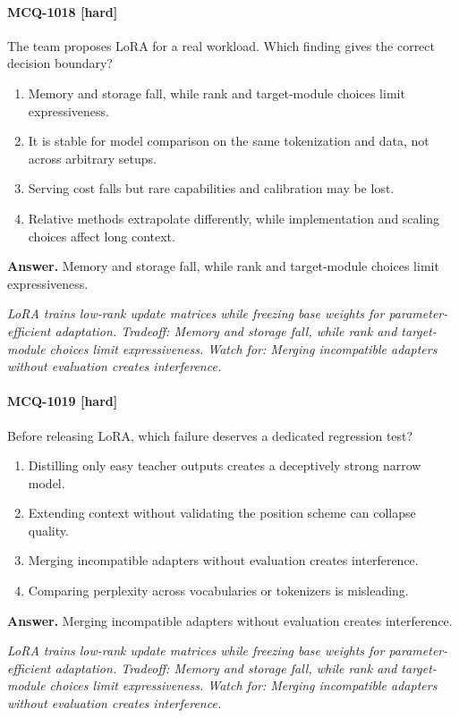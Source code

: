 \paragraph{MCQ-1018 [hard]} The team proposes LoRA for a real workload. Which finding gives the correct decision boundary?
\begin{enumerate}[label=\Alph*.]
\item Memory and storage fall, while rank and target-module choices limit expressiveness.
\item It is stable for model comparison on the same tokenization and data, not across arbitrary setups.
\item Serving cost falls but rare capabilities and calibration may be lost.
\item Relative methods extrapolate differently, while implementation and scaling choices affect long context.
\end{enumerate}
\noindent\textbf{Answer.} Memory and storage fall, while rank and target-module choices limit expressiveness.
\par\textit{LoRA trains low-rank update matrices while freezing base weights for parameter-efficient adaptation. Tradeoff: Memory and storage fall, while rank and target-module choices limit expressiveness. Watch for: Merging incompatible adapters without evaluation creates interference.}
\paragraph{MCQ-1019 [hard]} Before releasing LoRA, which failure deserves a dedicated regression test?
\begin{enumerate}[label=\Alph*.]
\item Distilling only easy teacher outputs creates a deceptively strong narrow model.
\item Extending context without validating the position scheme can collapse quality.
\item Merging incompatible adapters without evaluation creates interference.
\item Comparing perplexity across vocabularies or tokenizers is misleading.
\end{enumerate}
\noindent\textbf{Answer.} Merging incompatible adapters without evaluation creates interference.
\par\textit{LoRA trains low-rank update matrices while freezing base weights for parameter-efficient adaptation. Tradeoff: Memory and storage fall, while rank and target-module choices limit expressiveness. Watch for: Merging incompatible adapters without evaluation creates interference.}

